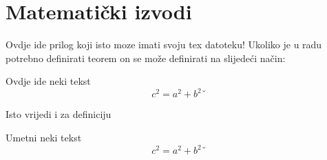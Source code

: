 \chapter{Matematički izvodi}
Ovdje ide prilog koji isto moze imati svoju tex datoteku!
Ukoliko je u radu potrebno definirati teorem on se može definirati na slijedeći način:
\begin{theorem}[Proba]
Ovdje ide neki tekst
\begin{equation}
c^2 = a^2+b^2ˇ
\end{equation}
\end{theorem}

Isto vrijedi i za definiciju
\begin{definition}[adf]
Umetni neki tekst
\begin{equation}
c^2 = a^2+b^2ˇ
\end{equation}
\end{definition}